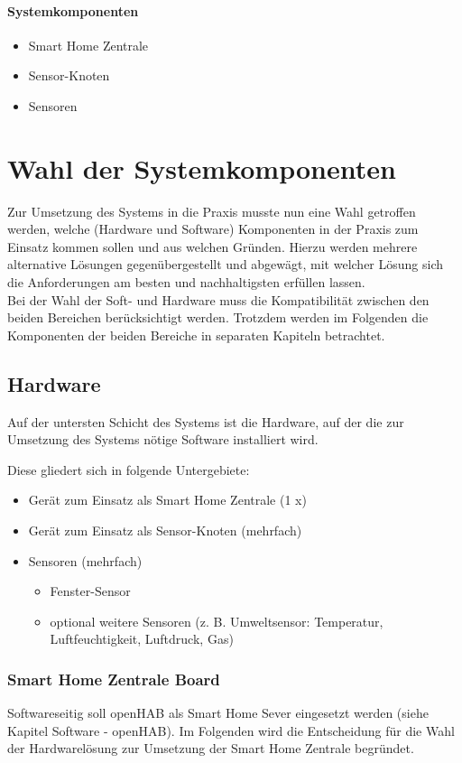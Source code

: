 \documentclass[a4paper,10pt,twocolumn]{article}
\begin{document}
\paragraph{Systemkomponenten}
\begin{itemize}
    \item Smart Home Zentrale
    \item Sensor-Knoten
    \item Sensoren
\end{itemize}

\section{Wahl der Systemkomponenten}
Zur Umsetzung des Systems in die Praxis musste nun eine Wahl getroffen werden, welche (Hardware und Software) Komponenten in der Praxis zum Einsatz kommen sollen und aus welchen Gründen. Hierzu werden mehrere alternative Lösungen gegenübergestellt und abgewägt, mit welcher Lösung sich die Anforderungen am besten und nachhaltigsten erfüllen lassen.\\
Bei der Wahl der Soft- und Hardware muss die Kompatibilität zwischen den beiden Bereichen berücksichtigt werden. Trotzdem werden im Folgenden die Komponenten der beiden Bereiche in separaten Kapiteln betrachtet.

\subsection{Hardware}

Auf der untersten Schicht des Systems ist die Hardware, auf der die zur Umsetzung des Systems nötige Software installiert wird.

Diese gliedert sich in folgende Untergebiete:
\begin{itemize}
    \item Gerät zum Einsatz als Smart Home Zentrale (1 x)
    \item Gerät zum Einsatz als Sensor-Knoten (mehrfach)
    \item Sensoren (mehrfach)
    \begin{itemize}
        \item Fenster-Sensor
        \item optional weitere Sensoren (z. B. Umweltsensor: Temperatur, Luftfeuchtigkeit, Luftdruck, Gas)
    \end{itemize}	
\end{itemize}

\subsubsection{Smart Home Zentrale Board}
Softwareseitig soll openHAB als Smart Home Sever eingesetzt werden (siehe Kapitel Software - openHAB). Im Folgenden wird die Entscheidung für die Wahl der Hardwarelösung zur Umsetzung der Smart Home Zentrale begründet. 
\end{document}
